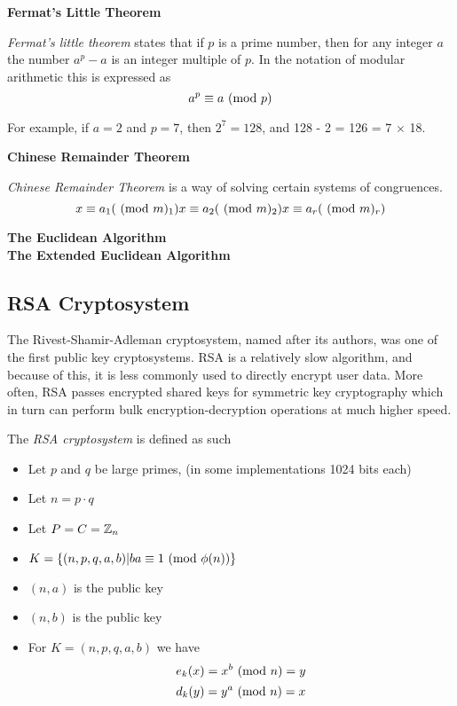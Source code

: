 \textbf{Fermat's Little Theorem}\\
\begin{definition}
    \textit{Fermat's little theorem} states that if $p$ is a prime number,
    then for any integer $a$ the number $a^p - a$ is an integer multiple of $p$.
    In the notation of modular arithmetic this is expressed as
    $$ a^p \equiv a \ (\mathrm{mod}\ p) $$
\end{definition}
For example, if $a = 2$ and $p = 7$, then $2^7 = 128$, and 128 - 2 = 126 = 7 $\times$ 18.

\textbf{Chinese Remainder Theorem}\\
\begin{definition}
    \textit{Chinese Remainder Theorem} is a way of solving certain systems of congruences.
    $$
    x \equiv a_1 (\ (\mathrm{mod}\ m)_1) \\
    x \equiv a_2 (\ (\mathrm{mod}\ m)_2) \\
    x \equiv a_r (\ (\mathrm{mod}\ m)_r)
    $$
\end{definition}

\textbf{The Euclidean Algorithm}\\

\textbf{The Extended Euclidean Algorithm}\\

\subsection{RSA Cryptosystem}
The Rivest-Shamir-Adleman cryptosystem,
named after its authors, was one of the first public key cryptosystems.
RSA is a relatively slow algorithm, and because of this,
it is less commonly used to directly encrypt user data.
More often, RSA passes encrypted shared keys for symmetric key cryptography
which in turn can perform bulk encryption-decryption operations at much higher speed.

\begin{definition}
    The \textit{RSA cryptosystem} is defined as such
    \begin{itemize}
        \item Let $p$ and $q$ be large primes, (in some implementations 1024 bits each)
        \item Let $n = p \cdot q$
        \item Let $P = C = \mathbb{Z}_n$
        \item $K = \{(n,p,q,a,b) | ba \equiv 1 \ (\mathrm{mod}\ \phi(n))\}$
        \item $(n,a)$ is the public key
        \item $(n,b)$ is the public key
        \item For $K = (n,p,q,a,b)$ we have
            $$e_k(x) = x^b \ (\mathrm{mod}\ n) = y$$
            $$d_k(y) = y^a \ (\mathrm{mod}\ n) = x$$
    \end{itemize}
\end{definition}


